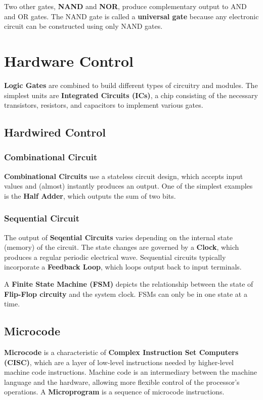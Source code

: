 \documentclass[pdftex,10pt]{article}
\begin{document}
Two other gates, \textbf{NAND} and \textbf{NOR}, produce complementary output to AND and OR gates. The NAND gate is called a \textbf{universal gate} because any electronic circuit can be constructed using only NAND gates.

\section{Hardware Control}

\textbf{Logic Gates} are combined to build different types of circuitry and modules. The simplest units are \textbf{Integrated Circuits (ICs)}, a chip consisting of the necessary transistors, resistors, and capacitors to implement various gates.

\subsection{Hardwired Control}
\subsubsection{Combinational Circuit}

\textbf{Combinational Circuits} use a stateless circuit design, which accepts input values and (almost) instantly produces an output. One of the simplest examples is the \textbf{Half Adder}, which outputs the sum of two bits.

\subsubsection{Sequential Circuit}

The output of \textbf{Seqential Circuits} varies depending on the internal state (memory) of the circuit. The state changes are governed by a \textbf{Clock}, which produces a regular periodic electrical wave. Sequential circuits typically incorporate a \textbf{Feedback Loop}, which loops output back to input terminals.

A \textbf{Finite State Machine (FSM)} depicts the relationship between the state of \textbf{Flip-Flop circuity} and the system clock. FSMs can only be in one state at a time.

\subsection{Microcode}

\textbf{Microcode} is a characteristic of \textbf{Complex Instruction Set Computers (CISC)}, which are a layer of low-level instructions needed by higher-level machine code instructions. Machine code is an intermediary between the machine language and the hardware, allowing more flexible control of the processor's operations. A \textbf{Microprogram} is a sequence of microcode instructions.
\end{document}
